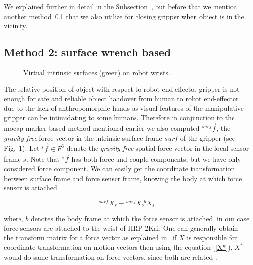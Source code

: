\documentclass[a4paper, 12pt, oneside]{Thesis}  %
\begin{document}
We explained further in detail in the Subsection~, but before that we mention another method~\ref{surface wrench} that we also utilize for closing gripper when object is in the vicinity.



\subsection{Method 2: surface wrench based}\label{surface wrench}

\begin{figure}[ht]
	\caption{Virtual intrinsic surfaces (green) on robot wrists.}
	\label{fig:wrist-surface2}
\end{figure}

The relative position of object with respect to robot end-effector gripper is not enough for safe and reliable object handover from human to robot end-effector due to the lack of anthropomorphic hands as visual features of the manipulative gripper can be intimidating to some humans. Therefore in conjunction to the mocap marker based method mentioned earlier we also computed ${}^{surf}\vec{f}$, the \textit{gravity-free} force vector in the intrinsic surface frame $surf$ of the gripper (see Fig.~\ref{fig:wrist-surface2}). Let ${}^s\vec{f}\in F^6$ denote the \textit{gravity-free} spatial force vector in the local sensor frame $s$. Note that ${}^s\vec{f}$ has both force and couple components, but we have only considered force component. We can easily get the coordinate transformation between surface frame and force sensor frame, knowing the body at which force sensor is attached.

\begin{equation}\label{X_s_surf}
    {}^{surf}X_{s} = {}^{surf}X_{b} {}^{b}X_s
\end{equation}

where, $b$ denotes the body frame at which the force sensor is attached, in our case force sensors are attached to the wrist of HRP-2Kai. One can generally obtain the transform matrix for a force vector as explained in~\cite{featherstone2014rigid} if $X$ is responsible for coordinate transformation on motion vectors then using the equation (\ref{X*}), $X^{*}$ would do same transformation on force vectors, since both are related~\cite{featherstone2014rigid},
\end{document}
